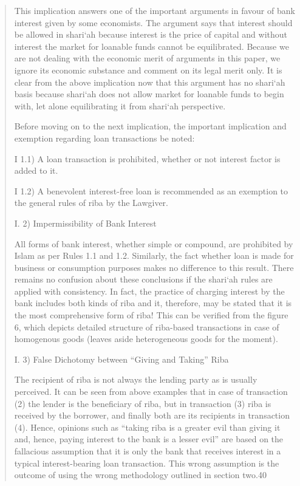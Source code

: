 \begin{quote}
This implication answers one of the important arguments in favour of bank interest given by some economists. The argument says that interest should be allowed in shari‘ah because interest is the price of capital and without interest the market for loanable funds cannot be equilibrated. Because we are not dealing with the economic merit of arguments in this paper, we ignore its economic substance and comment on its legal merit only. It is clear from the above implication now that this argument has no shari‘ah basis because shari‘ah does not allow market for loanable funds to begin with, let alone equilibrating it from shari‘ah perspective.

Before moving on to the next implication, the important implication and exemption regarding loan transactions be noted:

I 1.1) A loan transaction is prohibited, whether or not interest factor is added to it.

I 1.2) A benevolent interest-free loan is recommended as an exemption to the general rules of riba by the Lawgiver.

I. 2) Impermissibility of Bank Interest

All forms of bank interest, whether simple or compound, are prohibited by Islam as per Rules 1.1 and 1.2. Similarly, the fact whether loan is made for business or consumption purposes makes no difference to this result. There remains no confusion about these conclusions if the shari‘ah rules are applied with consistency. In fact, the practice of charging interest by the bank includes both kinds of riba and it, therefore, may be stated that it is the most comprehensive form of riba! This can be verified from the figure 6, which depicts detailed structure of riba-based transactions in case of homogenous goods (leaves aside heterogeneous goods for the moment).

I. 3) False Dichotomy between “Giving and Taking” Riba

The recipient of riba is not always the lending party as is usually perceived. It can be seen from above examples that in case of transaction (2) the lender is the beneficiary of riba, but in transaction (3) riba is received by the borrower, and finally both are its recipients in transaction (4). Hence, opinions such as “taking riba is a greater evil than giving it and, hence, paying interest to the bank is a lesser evil” are based on the fallacious assumption that it is only the bank that receives interest in a typical interest-bearing loan transaction. This wrong assumption is the outcome of using the wrong methodology outlined in section two.40


\end{quote}
